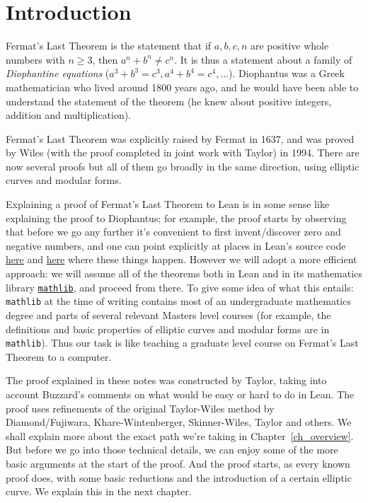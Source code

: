 \chapter{Introduction}

Fermat's Last Theorem is the statement that if $a,b,c,n$ are positive whole numbers with $n\geq 3$, then $a^n+b^n\not=c^n$. It is thus a statement about a family of \emph{Diophantine equations} ($a^3+b^3=c^3, a^4+b^4=c^4,\ldots$). Diophantus was a Greek mathematician who lived around 1800 years ago, and he would have been able to understand the statement of the theorem (he knew about positive integers, addition and multiplication).

Fermat's Last Theorem was explicitly raised by Fermat in 1637, and was proved by Wiles (with the proof completed in joint work with Taylor) in 1994. There are now several proofs but all of them go broadly in the same direction, using elliptic curves and modular forms.

Explaining a proof of Fermat's Last Theorem to Lean is in some sense like explaining the proof to Diophantus; for example, the proof starts by observing that before we go any further it's convenient to first invent/discover zero and negative numbers, and one can point explicitly at places in Lean's source code \href{https://github.com/leanprover/lean4/blob/260eaebf4e804c9ac1319532970544a4e157c336/src/Init/Prelude.lean#L1049}{here} and \href{https://github.com/leanprover/lean4/blob/260eaebf4e804c9ac1319532970544a4e157c336/src/Init/Data/Int/Basic.lean#L45}{here} where these things happen. However we will adopt a more efficient approach: we will assume all of the theorems both in Lean and in its mathematics library \href{https://github.com/leanprover-community/mathlib4}{\tt mathlib}, and proceed from there. To give some idea of what this entails: {\tt mathlib} at the time of writing contains most of an undergraduate mathematics degree and parts of several relevant Masters level courses (for example, the definitions and basic properties of elliptic curves and modular forms are in {\tt mathlib}). Thus our task is like teaching a graduate level course on Fermat's Last Theorem to a computer.

The proof explained in these notes was constructed by Taylor, taking into account Buzzard's comments on what would be easy or hard to do in Lean. The proof uses refinements of the original Taylor-Wiles method by Diamond/Fujiwara, Khare-Wintenberger, Skinner-Wiles, Taylor and others. We shall explain more about the exact path we're taking in Chapter~\ref{ch_overview}. But before we go into those technical details, we can enjoy some of the more basic arguments at the start of the proof. And the proof starts, as every known proof does, with some basic reductions and the introduction of a certain elliptic curve. We explain this in the next chapter.
